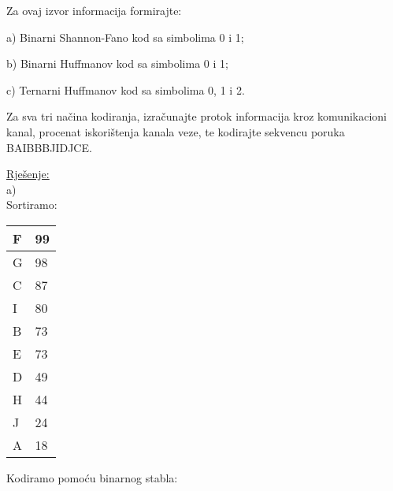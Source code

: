 \documentclass[12pt]{article}
\begin{document}
Za ovaj izvor informacija formirajte:

a) Binarni Shannon-Fano kod sa simbolima 0 i 1;

b) Binarni Huffmanov kod sa simbolima 0 i 1;

c) Ternarni Huffmanov kod sa simbolima 0, 1 i 2.

Za sva tri načina kodiranja, izračunajte protok informacija kroz komunikacioni kanal, procenat iskorištenja kanala veze, te kodirajte sekvencu poruka BAIBBBJIDJCE.

\underline{Rješenje:}\\

a)\\

Sortiramo:

\begin{table}[hp]
\centering
\begin{tabular}{|l|l|}
\hline
F & 99 \\ \hline
G & 98 \\ \hline
C & 87 \\ \hline
I & 80 \\ \hline
B & 73 \\ \hline
E & 73 \\ \hline
D & 49 \\ \hline
H & 44 \\ \hline
J & 24 \\ \hline
A & 18 \\ \hline
\end{tabular}
\end{table}

Kodiramo pomoću binarnog stabla:
\end{document}
